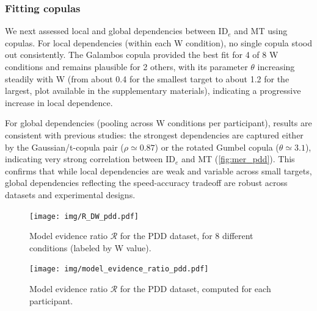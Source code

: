 \documentclass[acmlarge, manuscript,review]{acmart}
\newcommand{\ide}{\ensuremath{{\text{ID}_e}}\xspace}
\begin{document}
\subsubsection{Fitting copulas}
We next assessed local and global dependencies between \ide and MT using copulas. For local dependencies (within each W condition), no single copula stood out consistently. The Galambos copula provided the best fit for 4 of 8 W conditions and remains plausible for 2 others, with its parameter $\theta$ increasing steadily with W (from about 0.4 for the smallest target to about 1.2 for the largest, plot available in the supplementary materials), indicating a progressive increase in local dependence.

For global dependencies (pooling across W conditions per participant), results are consistent with previous studies: the strongest dependencies are captured either by the Gaussian/t-copula pair ($\rho \simeq 0.87$) or the rotated Gumbel copula ($\theta \simeq 3.1$), indicating very strong correlation between 
\ide and MT (\autoref{fig:mer_pdd}). This confirms that while local dependencies are weak and variable across small targets, global dependencies reflecting the speed-accuracy tradeoff are robust across datasets and experimental designs.


\begin{figure}[htbp]
	\centering
	\texttt{[image: img/R\_DW\_pdd.pdf]}
	\caption{Model evidence ratio $\mathcal{R}$ for the PDD dataset, for 8 different conditions (labeled by W value).}
	\label{fig:R_DW_pdd}
\end{figure}
\begin{figure}[htbp]
	\centering
	\texttt{[image: img/model\_evidence\_ratio\_pdd.pdf]}
	\caption{Model evidence ratio $\mathcal{R}$ for the PDD dataset, computed for each participant.}
	\label{fig:mer_pdd}
\end{figure}

\end{document}
